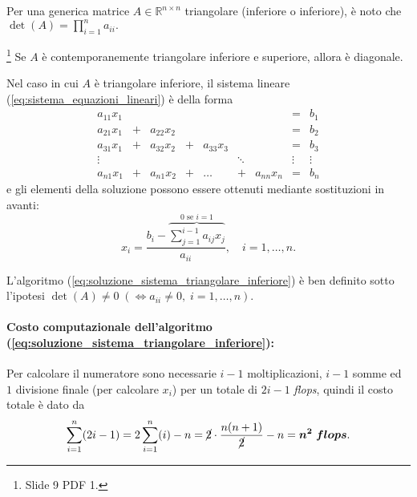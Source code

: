 \noindent Per una generica matrice $A\in\mathbb R^{n\times n}$ triangolare (inferiore o inferiore), è noto che $\det(A)=\prod_{i=1}^n a_{ii}.$

\begin{remark}\footnote{Slide 9 PDF 1.}
    Se $A$ è contemporanemente triangolare inferiore e superiore, allora è diagonale.
\end{remark}

Nel caso in cui $A$ è triangolare inferiore, il sistema lineare (\ref{eq:sistema_equazioni_lineari}) è della forma
\begin{equation}\label{eq:sistema_lineare_triangolare_inferiore}
    \begin{matrix}
        a_{11} x_1 && && && &=& b_1\\
        a_{21} x_1 &+& a_{22} x_2 && && &=& b_2\\
        a_{31} x_1  &+& a_{32} x_2 &+& a_{33} x_3 && &=& b_3\\
        \vdots && && &\ddots& &\vdots &\vdots\\
        a_{n1} x_1 &+& a_{n1} x_2 &+& \hdots &+& a_{nn} x_n &=& b_n
    \end{matrix}
\end{equation}
e gli elementi della soluzione possono essere ottenuti mediante sostituzioni in avanti:
\begin{equation}\label{eq:soluzione_sistema_triangolare_inferiore}
    x_i=\frac{b_i-\overbrace{\sum_{j=1}^{i-1}a_{ij}x_j}^{\text{0 se $i=1$}}}{a_{ii}},\quad i=1,\hdots,n.
\end{equation}

L'algoritmo (\ref{eq:soluzione_sistema_triangolare_inferiore}) è ben definito sotto l'ipotesi $\det(A)\neq 0\; (\iff a_{ii}\neq 0,\; i=1,\hdots, n)$.

\paragraph{Costo computazionale dell'algoritmo (\ref{eq:soluzione_sistema_triangolare_inferiore}):} Per calcolare il numeratore sono necessarie $i-1$ moltiplicazioni, $i-1$ somme ed $1$ divisione finale (per calcolare $x_i$) per un totale di $2i-1$ \textit{flops}, quindi il costo totale è dato da
\begin{equation}\label{eq:flops_soluzione_sistema_triangolare_superiore}
    \sum_{i=1}^n(2i-1)=2\sum_{i=1}^n (i)-n= \cancel{2}\cdot\frac{n(n+1)}{\cancel{2}}-n=\boldsymbol{n^2\; flops}.
\end{equation}

